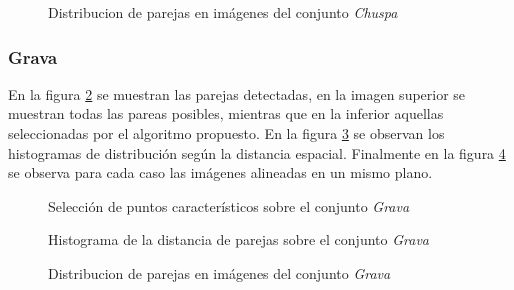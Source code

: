 \begin{figure}[h]
	\centering     %
	\hspace{1mm}%
	
	\caption[Distribucion de parejas en imágenes del conjunto \textit{Chuspa}]{Distribucion de parejas en imágenes del conjunto \textit{Chuspa}}
	\label{imagen:grid:0233-align}
\end{figure}


\subsubsection*{Grava}
En la figura \ref{imagen:grid:geo-match} se muestran las parejas detectadas, en la imagen superior se muestran todas las pareas posibles, mientras que en la inferior aquellas seleccionadas por el algoritmo propuesto. En la figura \ref{imagen:grid:geo-hist} se observan los histogramas de distribución según la distancia espacial. Finalmente en la figura \ref{imagen:grid:geo-align} se observa para cada caso las imágenes alineadas en un mismo plano.

\begin{figure}[h]
	\centering     %
	\hspace{1mm}%
	
	\caption[Selección de puntos caracteristicos sobre el conjunto \textit{Grava}]{Selección de puntos característicos sobre el conjunto \textit{Grava}}
	\label{imagen:grid:geo-match}
\end{figure}

\begin{figure}[h]
	\centering     %
	\hspace{3mm}%
	
	\caption[Histograma de la distancia de parejas sobre el conjunto \textit{Grava}]{Histograma de la distancia de parejas sobre el conjunto \textit{Grava}}
	\label{imagen:grid:geo-hist}
\end{figure}
\begin{figure}[h]
	\centering     %
	\hspace{1mm}%
	
	\caption[Distribucion de parejas en imágenes del conjunto \textit{Grava}]{Distribucion de parejas en imágenes del conjunto \textit{Grava}}
	\label{imagen:grid:geo-align}
\end{figure}




